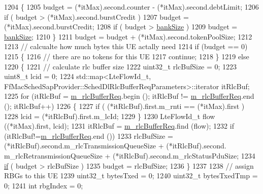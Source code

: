 \begin{DoxyCode}
1204         \{
1205                 budget = (*itMax).second.counter - (*itMax).second.debtLimit;
1206                 \textcolor{keywordflow}{if} ( budget > (*itMax).second.burstCredit )
1207                   budget = (*itMax).second.burstCredit;
1208                 \textcolor{keywordflow}{if} ( budget > \hyperlink{classns3_1_1FdTbfqFfMacScheduler_a2e499981c641859beb7ae48a0c343ba1}{bankSize} )
1209                   budget = \hyperlink{classns3_1_1FdTbfqFfMacScheduler_a2e499981c641859beb7ae48a0c343ba1}{bankSize};
1210               \}
1211       budget = budget + (*itMax).second.tokenPoolSize;
1212 
1213       \textcolor{comment}{// calcualte how much bytes this UE actally need}
1214       \textcolor{keywordflow}{if} (budget == 0)
1215         \{
1216           \textcolor{comment}{// there are no tokens for this UE}
1217                 \textcolor{keywordflow}{continue};
1218         \}
1219       \textcolor{keywordflow}{else} 
1220         \{       
1221                 \textcolor{comment}{// calculate rlc buffer size}
1222                 uint32\_t rlcBufSize = 0;
1223           uint8\_t lcid = 0;
1224           std::map<LteFlowId\_t, FfMacSchedSapProvider::SchedDlRlcBufferReqParameters>::iterator itRlcBuf;
1225           \textcolor{keywordflow}{for} (itRlcBuf = \hyperlink{classns3_1_1FdTbfqFfMacScheduler_a1de1056077db96c215eb47ef724e1167}{m\_rlcBufferReq}.begin (); itRlcBuf != 
      \hyperlink{classns3_1_1FdTbfqFfMacScheduler_a1de1056077db96c215eb47ef724e1167}{m\_rlcBufferReq}.end (); itRlcBuf++)
1226                   \{
1227               \textcolor{keywordflow}{if} ( (*itRlcBuf).first.m\_rnti == (*itMax).first )
1228                 lcid = (*itRlcBuf).first.m\_lcId;
1229                   \}
1230           LteFlowId\_t flow ((*itMax).first, lcid);
1231           itRlcBuf = \hyperlink{classns3_1_1FdTbfqFfMacScheduler_a1de1056077db96c215eb47ef724e1167}{m\_rlcBufferReq}.find (flow);
1232           \textcolor{keywordflow}{if} (itRlcBuf!=\hyperlink{classns3_1_1FdTbfqFfMacScheduler_a1de1056077db96c215eb47ef724e1167}{m\_rlcBufferReq}.end ())
1233                   rlcBufSize = (*itRlcBuf).second.m\_rlcTransmissionQueueSize + (*itRlcBuf).second.
      m\_rlcRetransmissionQueueSize + (*itRlcBuf).second.m\_rlcStatusPduSize;
1234                 \hyperlink{loss__ITU1238_8m_a419d895abe1313c35fa353c93802647e}{if} ( budget > rlcBufSize )
1235                   budget = rlcBufSize;
1236         \}
1237 
1238       \textcolor{comment}{// assign RBGs to this UE }
1239       uint32\_t bytesTxed = 0;
1240       uint32\_t bytesTxedTmp = 0;
1241       \textcolor{keywordtype}{int} rbgIndex = 0;

\end{DoxyCode}
